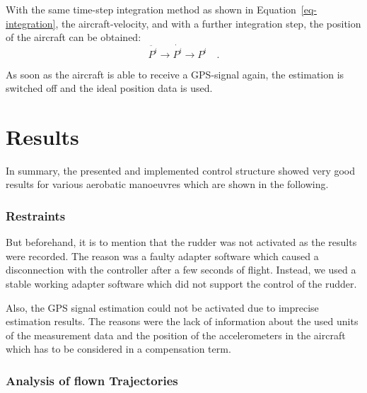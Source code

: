 \documentclass[11pt,a4paper]{scrartcl}		%
\begin{document}
With the same time-step integration method as shown in Equation~\ref{eq-integration}, the aircraft-velocity, and with a further integration step, the position of the aircraft can be obtained:
\begin{equation}
\ddot{P^i} \rightarrow \dot{P^i} \rightarrow P^i \quad .
\end{equation}

\smallskip

As soon as the aircraft is able to receive a GPS-signal again, the estimation is switched off and the ideal position data is used.


\medskip





\section{Results}\label{ch-Results}


In summary, the presented and implemented control structure showed very good results for various aerobatic manoeuvres which are shown in the following.

\subsubsection*{Restraints}

But beforehand, it is to mention that the rudder was not activated as the results were recorded.
The reason was a faulty adapter software which caused a disconnection with the controller after a few seconds of flight. Instead, we used a stable working adapter software which did not support the control of the rudder.

Also, the GPS signal estimation could not be activated due to imprecise estimation results.
The reasons were the lack of information about the used units of the measurement data and the position of the accelerometers in the aircraft which has to be considered in a compensation term.

\subsubsection*{Analysis of flown Trajectories}

\bigskip






\end{document}
